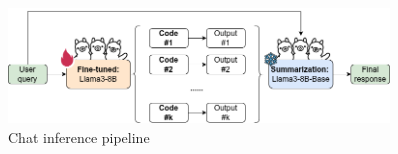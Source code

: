 \begin{figure}[H]
  \centering
  \includegraphics[width=0.9\textwidth]{images/inference_pipeline.drawio.png}
  \caption{Chat inference pipeline}
  \label{fig:inference_pipeline}
\end{figure}



